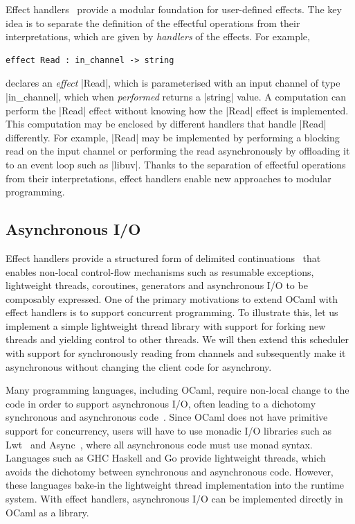 \documentclass[sigplan,screen]{acmart}
\begin{document}
Effect handlers~\cite{Plotkin09} provide a modular foundation for user-defined
effects. The key idea is to separate the definition of the effectful operations
from their interpretations, which are given by \emph{handlers} of the effects.
For example,
%
\begin{lstlisting}
effect Read : in_channel -> string
\end{lstlisting}
%
declares an \emph{effect} |Read|, which is parameterised with an input channel
of type |in_channel|, which when \emph{performed} returns a |string| value. A
computation can perform the |Read| effect without knowing how the |Read| effect
is implemented. This computation may be enclosed by different handlers that
handle |Read| differently. For example, |Read| may be implemented by performing
a blocking read on the input channel or performing the read asynchronously by
offloading it to an event loop such as |libuv|. Thanks to the separation of
effectful operations from their interpretations, effect handlers enable new
approaches to modular programming.

\subsection{Asynchronous I/O}
\label{sec:aio}

Effect handlers provide a structured form of delimited
continuations~\cite{Danvy90} that enables non-local control-flow mechanisms
such as resumable exceptions, lightweight threads, coroutines, generators and
asynchronous I/O to be composably expressed. One of the primary motivations to
extend OCaml with effect handlers is to support concurrent programming. To
illustrate this, let us implement a simple lightweight thread library with
support for forking new threads and yielding control to other threads. We will
then extend this scheduler with support for synchronously reading from channels
and subsequently make it asynchronous without changing the client code for
asynchrony.

Many programming languages, including OCaml, require non-local change to the
code in order to support asynchronous I/O, often leading to a dichotomy
synchronous and asynchronous code~\cite{colour}. Since OCaml does not have
primitive support for concurrency, users will have to use monadic I/O libraries
such as Lwt~\cite{lwt} and Async~\cite{async}, where all asynchronous code must
use monad syntax. Languages such as GHC Haskell and Go provide lightweight
threads, which avoids the dichotomy between synchronous and asynchronous code.
However, these languages bake-in the lightweight thread implementation into the
runtime system. With effect handlers, asynchronous I/O can be implemented
directly in OCaml as a library.
\end{document}
